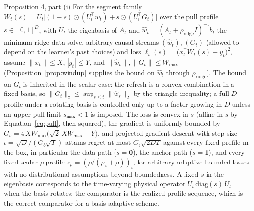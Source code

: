\begin{restated}{Proposition 4, part (i)}
For the segment family $W_t(s) = U_t\bigl[(1 - s) \odot (U_t^\top \widehat w_t) + s \odot (U_t^\top G_t)\bigr]$ over the pull profile $s \in [0,1]^D$, with $U_t$ the eigenbasis of $\bar A_t$ and $\widehat w_t = (\bar A_t + \rho_{\mathrm{ridge}} I)^{-1}\bar b_t$ the minimum-ridge data solve, arbitrary causal streams $(\widehat w_t)$, $(G_t)$ (allowed to depend on the learner's past choices) and loss $\ell_t(s) = \bigl(x_t^\top W_t(s) - y_t\bigr)^2$, assume $\|x_t\| \le X$, $|y_t| \le Y$, and $\|\widehat w_t\|, \|G_t\| \le W_{\max}$ (Proposition~\ref{prop:windup} supplies the bound on $\widehat w_t$ through $\rho_{\mathrm{ridge}}$). The bound on $G_t$ is inherited in the scalar case: the refresh is a convex combination in a fixed basis, so $\|G_t\|_2 \le \sup_{s \le t}\|\widehat w_s\|_2$ by the triangle inequality; a full-$D$ profile under a rotating basis is controlled only up to a factor growing in $D$ unless an upper pull limit $s_{\max}<1$ is imposed.
The loss is convex in $s$ (affine in $s$ by Equation~\eqref{eq:pull}, then squared), the gradient is uniformly bounded by
$G_b = 4\,X W_{\max}\bigl(\sqrt 2\, X W_{\max} + Y\bigr)$,
and projected gradient descent with step size $\iota = \sqrt{D}/(G_b\sqrt T)$ attains regret at most $G_b\sqrt{2DT}$ against every fixed profile in the box, in particular the data path ($s = \mathbf 0$), the anchor path ($s = \mathbf 1$), and every fixed scalar-$\rho$ profile $s_\rho = (\rho/(\mu_i + \rho))_i$, for arbitrary adaptive bounded losses with no distributional assumptions beyond boundedness.
A fixed $s$ in the eigenbasis corresponds to the time-varying physical operator $U_t\,\mathrm{diag}(s)\,U_t^\top$ when the basis rotates; the comparator is the realized profile sequence, which is the correct comparator for a basis-adaptive scheme.
\end{restated}

